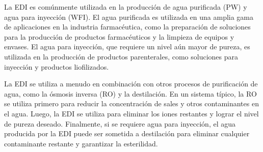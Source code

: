 La EDI es comúnmente utilizada en la producción de agua purificada (PW) y agua para inyección (WFI). El agua purificada es utilizada
en una amplia gama de aplicaciones en la industria farmacéutica, como la preparación de soluciones para la producción de productos
farmacéuticos y la limpieza de equipos y envases. El agua para inyección, que requiere un nivel aún mayor de pureza, es utilizada
en la producción de productos parenterales, como soluciones para inyección y productos liofilizados.

La EDI se utiliza a menudo en combinación con otros procesos de purificación de agua, como la ósmosis inversa (RO) y la destilación.
En un sistema típico, la RO se utiliza primero para reducir la concentración de sales y otros contaminantes en el agua. Luego, la EDI
se utiliza para eliminar los iones restantes y lograr el nivel de pureza deseado. Finalmente, si se requiere agua para inyección,
el agua producida por la EDI puede ser sometida a destilación para eliminar cualquier contaminante restante y garantizar la esterilidad.

